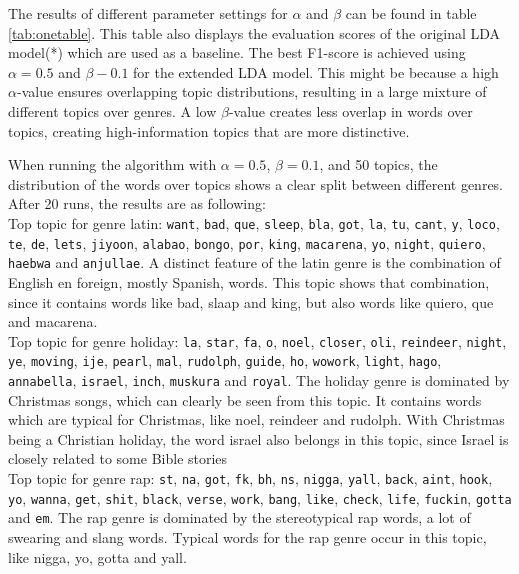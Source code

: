 The results of different parameter settings for $\alpha$ and $\beta$ can be found in table \ref{tab:onetable}. This table also displays the evaluation scores of the original LDA model(*) which are used as a baseline. The best F1-score is achieved using $\alpha=0.5$ and $\beta-0.1$ for the extended LDA model. This might be because a high $\alpha$-value ensures overlapping topic distributions, resulting in a large mixture of different topics over genres. A low $\beta$-value creates less overlap in words over topics, creating high-information topics that are more distinctive.
\label{tab:onetable}


When running the algorithm with $\alpha = 0.5$, $\beta = 0.1$, and 50 topics, the distribution of the words over topics shows a clear split between different genres. After 20 runs, the results are as following: \\
Top topic for genre latin: \verb|want|, \verb|bad|, \verb|que|, \verb|sleep|, \verb|bla|, \verb|got|, \verb|la|, \verb|tu|, \verb|cant|, \verb|y|, \verb|loco|, \verb|te|, \verb|de|, \verb|lets|, \verb|jiyoon|, \verb|alabao|, \verb|bongo|, \verb|por|, \verb|king|, \verb|macarena|, \verb|yo|, \verb|night|, \verb|quiero|, \verb|haebwa| and \verb|anjullae|. A distinct feature of the latin genre is the combination of English en foreign, mostly Spanish, words. This topic shows that combination, since it contains words like bad, slaap and king, but also words like quiero, que and macarena. \\
Top topic for genre holiday: \verb|la|, \verb|star|, \verb|fa|, \verb|o|, \verb|noel|, \verb|closer|, \verb|oli|, \verb|reindeer|, \verb|night|, \verb|ye|, \verb|moving|, \verb|ije|, \verb|pearl|, \verb|mal|, \verb|rudolph|, \verb|guide|, \verb|ho|, \verb|wowork|, \verb|light|, \verb|hago|, \verb|annabella|, \verb|israel|, \verb|inch|, \verb|muskura| and \verb|royal|. The holiday genre is dominated by Christmas songs, which can clearly be seen from this topic. It contains words which are typical for Christmas, like noel, reindeer and rudolph. With Christmas being a Christian holiday, the word israel also belongs in this topic, since Israel is closely related to some Bible stories \\
Top topic for genre rap: \verb|st|, \verb|na|, \verb|got|, \verb|fk|, \verb|bh|, \verb|ns|, \verb|nigga|, \verb|yall|, \verb|back|, \verb|aint|, \verb|hook|, \verb|yo|, \verb|wanna|, \verb|get|, \verb|shit|, \verb|black|, \verb|verse|, \verb|work|, \verb|bang|, \verb|like|, \verb|check|, \verb|life|, \verb|fuckin|, \verb|gotta| and \verb|em|. The rap genre is dominated by the stereotypical rap words, a lot of swearing and slang words. Typical words for the rap genre occur in this topic, like nigga, yo, gotta and yall. \\
